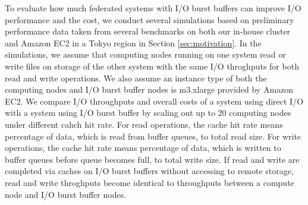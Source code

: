 To evaluate how much federated systems with I/O burst buffers can improve I/O performance and the cost, 
we conduct several simulations based on preliminary performance data taken from several 
benchmarks on both our in-house cluster and Amazon EC2 in a Tokyo region in Section \ref{sec:motivation}.%
In the simulations, we assume that computing nodes running on one system read or write files on storage of the other system with the same I/O throghputs for both read and write operations.
We also assume an instance type of both the computing nodes and I/O burst buffer nodes is m3.xlarge provided by Amazon EC2.
We compare I/O throughputs and overall costs of a system using direct I/O with a system using I/O burst buffer by scaling out up to 20 computing nodes
under different cahch hit rate.
For read operations, the cache hit rate means percentage of data, which is read from buffer queues, to total read size. 
For write operations, the cache hit rate means percentage of data, which is  written to buffer queues before queue becomes full, to total write size.
If read and write are completed via caches on I/O burst buffers
without accessing to remote storage, read and write throghputs become 
identical to throughputs between a compute node and I/O burst buffer nodes. 

	
